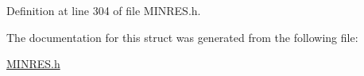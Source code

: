 Definition at line 304 of file M\+I\+N\+R\+E\+S.\+h.



The documentation for this struct was generated from the following file\+:\begin{DoxyCompactItemize}
\item 
\hyperlink{_m_i_n_r_e_s_8h}{M\+I\+N\+R\+E\+S.\+h}\end{DoxyCompactItemize}
